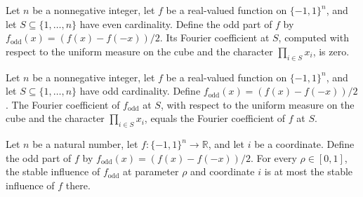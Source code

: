 \begin{theorem}
\label{FABL.fourierCoeff_oddPart_of_even}
\leanok
{}
Let $n$ be a nonnegative integer, let $f$ be a real-valued function on $\{-1,1\}^n$,
and let $S\subseteq\{1,\ldots,n\}$ have even cardinality. Define the odd part of $f$
by $f_{\mathrm{odd}}(x)=(f(x)-f(-x))/2$. Its Fourier coefficient at $S$, computed with
respect to the uniform measure on the cube and the character $\prod_{i\in S}x_i$, is
zero.
\end{theorem}

\begin{theorem}
\label{FABL.fourierCoeff_oddPart_of_odd}
\leanok
{}
Let $n$ be a nonnegative integer, let $f$ be a real-valued function on $\{-1,1\}^n$,
and let $S\subseteq\{1,\ldots,n\}$ have odd cardinality. Define
$f_{\mathrm{odd}}(x)=(f(x)-f(-x))/2$. The Fourier coefficient of $f_{\mathrm{odd}}$ at
$S$, with respect to the uniform measure on the cube and the character $\prod_{i\in
S}x_i$, equals the Fourier coefficient of $f$ at $S$.
\end{theorem}

\begin{theorem}
\label{FABL.stableInfluence_oddPart_le}
\leanok
{}
Let $n$ be a natural number, let $f:\{−1,1\}^n\to\mathbb R$, and let $i$ be a
coordinate. Define the odd part of $f$ by $f_{\mathrm{odd}}(x)=(f(x)-f(-x))/2$. For
every $\rho\in[0,1]$, the stable influence of $f_{\mathrm{odd}}$ at parameter $\rho$
and coordinate $i$ is at most the stable influence of $f$ there.
\end{theorem}

